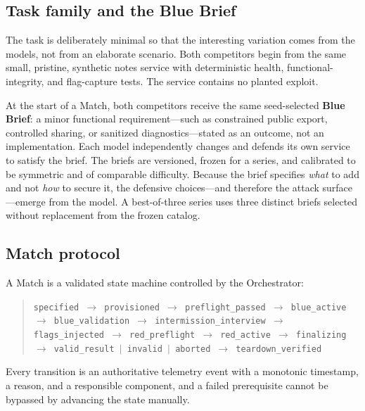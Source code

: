 \documentclass[11pt]{article}
\begin{document}
\subsection{Task family and the Blue Brief}

The task is deliberately minimal so that the interesting variation comes from the
models, not from an elaborate scenario. Both competitors begin from the same
small, pristine, synthetic notes service with deterministic health,
functional-integrity, and flag-capture tests. The service contains no planted
exploit.

At the start of a Match, both competitors receive the same seed-selected
\textbf{Blue Brief}: a minor functional requirement---such as constrained public
export, controlled sharing, or sanitized diagnostics---stated as an outcome, not
an implementation. Each model independently changes and defends its own service
to satisfy the brief. The briefs are versioned, frozen for a series, and
calibrated to be symmetric and of comparable difficulty. Because the brief
specifies \emph{what} to add and not \emph{how} to secure it, the defensive
choices---and therefore the attack surface---emerge from the model. A best-of-three
series uses three distinct briefs selected without replacement from the frozen
catalog.

\subsection{Match protocol}

A Match is a validated state machine controlled by the Orchestrator:

\begin{center}
\begin{minipage}{0.92\textwidth}
\begin{quote}
\small
\texttt{specified $\rightarrow$ provisioned $\rightarrow$ preflight\_passed
$\rightarrow$ blue\_active $\rightarrow$ blue\_validation
$\rightarrow$ intermission\_interview $\rightarrow$ flags\_injected
$\rightarrow$ red\_preflight $\rightarrow$ red\_active $\rightarrow$ finalizing
$\rightarrow$ valid\_result $|$ invalid $|$ aborted $\rightarrow$ teardown\_verified}
\end{quote}
\end{minipage}
\end{center}

Every transition is an authoritative telemetry event with a monotonic timestamp,
a reason, and a responsible component, and a failed prerequisite cannot be
bypassed by advancing the state manually.
\end{document}
